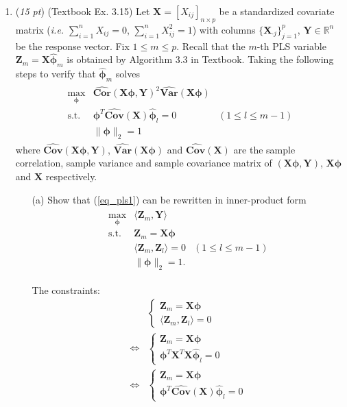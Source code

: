\documentclass[10pt]{article}
\theoremstyle{definition}
\theoremstyle{remark}
\newcommand{\Xb}{\mathbf{X}}
\newcommand{\bX}{\bm{X}}
\newcommand{\bY}{\bm{Y}}
\newcommand{\bZ}{\bm{Z}}
\newcommand{\bphi}{\bm{\phi}}
\newcommand{\bbR}{\mathbb{R}}
\newcommand{\bvar}{\textbf{Var}}
\newcommand{\bcov}{\textbf{Cov}}
\newcommand{\bcor}{\textbf{Cor}}
\begin{document}
\begin{enumerate}
	\item (\textit{15 pt}) (Textbook Ex. 3.15) Let $ \Xb = [X_{ij}]_{n\times p} $ be a standardized covariate matrix (\textit{i.e.} $ \sum_{i=1}^{n}X_{ij} = 0 $, $ \sum_{i=1}^{n}X_{ij}^{2} = 1 $) with columns $ \{ \bX_{\cdot j} \}_{j=1}^{p} $, $ \bY \in \bbR^{n} $ be the response vector. Fix $ 1 \le m \le p $. Recall that the $ m $-th PLS variable $ \bZ_{m} = \Xb \widehat{\bphi}_{m} $ is obtained by Algorithm 3.3 in Textbook. Taking the following steps to verify that $ \widehat{\bphi}_{m} $ solves
	\begin{align}
	\begin{array}{rll}
	\max\limits_{\bphi} & \widehat{\bcor}(\Xb\bphi,\bY)^{2}\widehat{\bvar}(\Xb\bphi)\\
	\textrm{s.t.}
	& \bphi^{T}\widehat{\bcov}(\Xb)\widehat{\bphi}_{l} = 0 & (1 \le l \le m-1)\\
	 & \|\bphi\|_{2} = 1
	\end{array} \label{eq_pls1}
	\end{align}
	where $ \widehat{\bcov}(\Xb\bphi,\bY) $, $ \widehat{\bvar}(\Xb\bphi) $ and $ \widehat{\bcov}(\Xb) $ are the sample correlation, sample variance and sample covariance matrix of $ (\Xb\bphi,\bY) $, $ \Xb\bphi $ and $ \Xb $ respectively.
	\begin{itemize}[leftmargin=*]
		\item [(a)] Show that (\ref{eq_pls1}) can be rewritten in inner-product form
		\begin{align}
		\begin{array}{rll}
		\max\limits_{\bphi} & \langle \bZ_{m},\bY \rangle \\
		\textrm{s.t.} 
		& \bZ_{m} = \Xb\bphi \\
		& \langle \bZ_{m}, \bZ_{l} \rangle = 0 & (1 \le l \le m-1)\\
		& \|\bphi\|_{2} = 1.
		\end{array} \label{eq_pls2}
		\end{align}
		
		The constraints:
		\begin{align*}
		    & \begin{cases}
		    \bZ_{m} = \Xb\bphi \\
		    \langle \bZ_{m}, \bZ_{l} \rangle = 0
		    \end{cases} \\
		    \iff & \begin{cases}
		    \bZ_{m} = \Xb\bphi \\
		    \bphi^T\Xb^T\Xb\widehat{\bphi}_{l} = 0
		    \end{cases} \\
		    \iff & \begin{cases}
		    \bZ_{m} = \Xb\bphi \\
		    \bphi^T\widehat{\bcov}(\Xb)\widehat{\bphi}_{l} = 0
		    \end{cases}
		\end{align*}
		

\end{itemize}
\end{enumerate}
\end{document}
